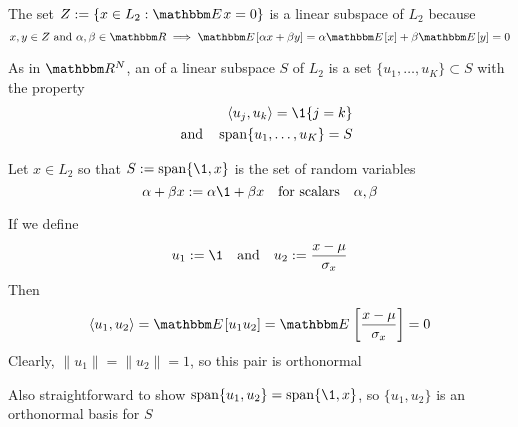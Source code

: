 \begin{frame}

    \vspace{2em}
    \Eg
    The set $Z := \setntn{x \in L_2}{\EE x = 0}$ is 
    a linear subspace of $L_2$ because 
    \begin{equation*}
        x, y \in Z
        \text{ and }
        \alpha, \beta \in \RR
         \implies
        \EE[\alpha x + \beta y] = \alpha \EE[x] + \beta \EE[y] = 0
    \end{equation*}
    
    \vspace{1em}    
    As in $\RR^N$, an  of a linear subspace $S$ of $L_2$ 
    is a set $\{u_1, \ldots, u_K\} \subset S$ with the property 
    \begin{align*}
        \inner{u_j, u_k}  = \1\{j = k\}
       \\  \quad \text{and} \quad
        \Span\{u_1, \ldots, u_K\} = S
    \end{align*}

\end{frame}

\begin{frame}

    \vspace{2em}
    \Eg
    Let $x \in L_2$ so that $S := \Span\{\1, x\}$ is the set of random variables
    \begin{equation}
         \alpha + \beta x 
         := \alpha \1 + \beta x
         \quad \text{for scalars} \quad
         \alpha, \beta   
    \end{equation}
    
    If we define
    \begin{equation*}
        u_1 := \1 
        \quad \text{and} \quad
        u_2 := \frac{x - \mu}{\sigma_x}  
    \end{equation*}
    Then 
    \begin{equation*}
        \inner{ u_1, u_2 } 
        = \EE[u_1 u_2] 
        = \EE \left[ \frac{x - \mu}{\sigma_x} \right]
        = 0
    \end{equation*}
    Clearly, $\|u_1\| = \|u_2\| = 1$, so this pair is
    orthonormal
    
    Also straightforward to show  $\Span\{u_1, u_2\} =
    \Span\{\1, x\}$, so $\{u_1, u_2\}$ is an orthonormal basis for $S$
    
\end{frame}


